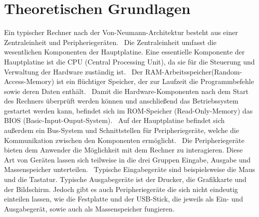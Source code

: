 \section{Theoretischen Grundlagen}
\label{sec:Theorie}
Ein typischer Rechner nach der Von-Neumann-Architektur besteht aus einer Zentraleinheit und Peripheriegeräten.~\cite[S.~92]{Herold.2012} Die Zentraleinheit umfasst die wesentlichen Komponenten der Hauptplatine. Eine essentielle Komponente der Hauptplatine ist die CPU (Central Processing Unit), da sie für die Steuerung und Verwaltung der Hardware zuständig ist.~\cite[S.~95]{Herold.2012} Der RAM-Arbeitsspeicher(Random-Access-Memory) ist ein flüchtiger Speicher, der zur Laufzeit die Programmbefehle sowie deren Daten enthält.~\cite[S.~96]{Herold.2012} Damit die Hardware-Komponenten nach dem Start des Rechners überprüft werden können und anschließend das Betriebssystem gestartet werden kann, befindet sich im ROM-Speicher (Read-Only-Memory) das BIOS (Basic-Input-Ouput-System).~\cite[S.~96]{Herold.2012} Auf der Hauptplatine befindet sich außerdem ein Bus-System und Schnittstellen für Peripheriegeräte, welche die Kommunikation zwischen den Komponenten ermöglicht.~\cite[S.~96]{Herold.2012}
Die Peripheriegeräte bieten dem Anwender die Möglichkeit mit dem Rechner zu interagieren. Diese Art von Geräten lassen sich teilweise in die drei Gruppen Eingabe, Ausgabe und Massenspeicher unterteilen.~\cite[S.~118]{Herold.2012} Typische Eingabegeräte sind beispielsweise die Maus und die Tastatur. Typische Ausgabegeräte ist der Drucker, die Grafikkarte und der Bildschirm. Jedoch gibt es auch Peripheriegeräte die sich nicht eindeutig einteilen lassen, wie die Festplatte und der USB-Stick, die jeweils als Ein- und Ausgabegerät, sowie auch als Massenspeicher fungieren.
